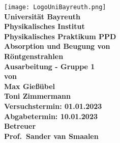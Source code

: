 \documentclass{article}               %
\begin{document}
  \setlength{\parindent}{0em}
    \begin{titlepage}
        \centering
        \texttt{[image: LogoUniBayreuth.png]}
        \vspace{0.5cm}
        {\large \textbf{\\Universität Bayreuth\\Physikalisches Institut\\Physikalisches Praktikum PPD}\\}
        \vspace{2.5cm}
        {\Huge \textbf{Absorption und Beugung von\\Röntgenstrahlen}\\}
        \vspace{2.5cm}
        {\LARGE \textbf{Ausarbeitung - Gruppe 1}\\}
        \vspace{0.5cm}
        {\large \textbf{von}\\}
        {\LARGE \textbf{Max Gießübel}\\}
        {\LARGE \textbf{Toni Zimmermann}\\} 	
        \vspace{2cm}
        {\large \textbf{Versuchstermin: 01.01.2023}\\}
        {\large \textbf{Abgabetermin: 10.01.2023}\\}
        \vspace{2cm}
        {\large \textbf{Betreuer\\}}
        {\LARGE \textbf{Prof.~Sander van Smaalen\\}}
        \vfill
    \end{titlepage}
    
    \tableofcontents
    \newpage
    
    
    \newpage
    
    \newpage
    
    \newpage
    
    \newpage
    
    \newpage
    \printbibliography
\end{document}

